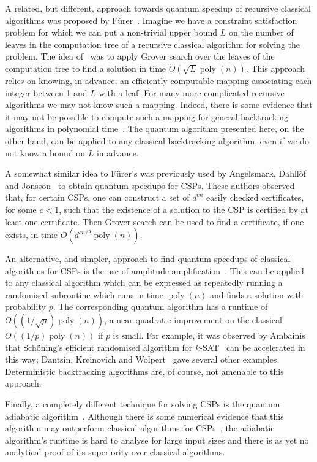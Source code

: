 \documentclass[11pt]{article}
\DeclareMathOperator{\poly}{poly}
\begin{document}
A related, but different, approach towards quantum speedup of recursive classical algorithms was proposed by F\"urer~\cite{furer08}. Imagine we have a constraint satisfaction problem for which we can put a non-trivial upper bound $L$ on the number of leaves in the computation tree of a recursive classical algorithm for solving the problem. The idea of~\cite{furer08} was to apply Grover search over the leaves of the computation tree to find a solution in time $O(\sqrt{L} \poly(n))$. This approach relies on knowing, in advance, an efficiently computable mapping associating each integer between 1 and $L$ with a leaf. For many more complicated recursive algorithms we may not know such a mapping. Indeed, there is some evidence that it may not be possible to compute such a mapping for general backtracking algorithms in polynomial time~\cite{stockmeyer85}. The quantum algorithm presented here, on the other hand, can be applied to any classical backtracking algorithm, even if we do not know a bound on $L$ in advance.

A somewhat similar idea to F\"urer's was previously used by Angelsmark, Dahll\"of and Jonsson~\cite{angelsmark02} to obtain quantum speedups for CSPs. These authors observed that, for certain CSPs, one can construct a set of $d^{cn}$ easily checked certificates, for some $c < 1$, such that the existence of a solution to the CSP is certified by at least one certificate. Then Grover search can be used to find a certificate, if one exists, in time $O(d^{cn/2} \poly(n))$.

An alternative, and simpler, approach to find quantum speedups of classical algorithms for CSPs is the use of amplitude amplification~\cite{brassard02}. This can be applied to any classical algorithm which can be expressed as repeatedly running a randomised subroutine which runs in time $\poly(n)$ and finds a solution with probability $p$. The corresponding quantum algorithm has a runtime of $O((1/\sqrt{p}) \poly(n))$, a near-quadratic improvement on the classical $O((1/p)\poly(n))$ if $p$ is small. For example, it was observed by Ambainis~\cite{ambainis04} that Sch\"oning's efficient randomised algorithm for $k$-SAT~\cite{schoning99} can be accelerated in this way; Dantsin, Kreinovich and Wolpert~\cite{dantsin05} gave several other examples. Deterministic backtracking algorithms are, of course, not amenable to this approach.

Finally, a completely different technique for solving CSPs is the quantum adiabatic algorithm~\cite{farhi00}. Although there is some numerical evidence that this algorithm may outperform classical algorithms for CSPs~\cite{farhi01}, the adiabatic algorithm's runtime is hard to analyse for large input sizes and there is as yet no analytical proof of its superiority over classical algorithms.
\end{document}
